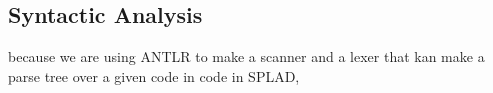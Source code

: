\subsection{Syntactic Analysis}
because we are using ANTLR to make a scanner and a lexer  that kan make a parse tree over a given code in code in SPLAD, 